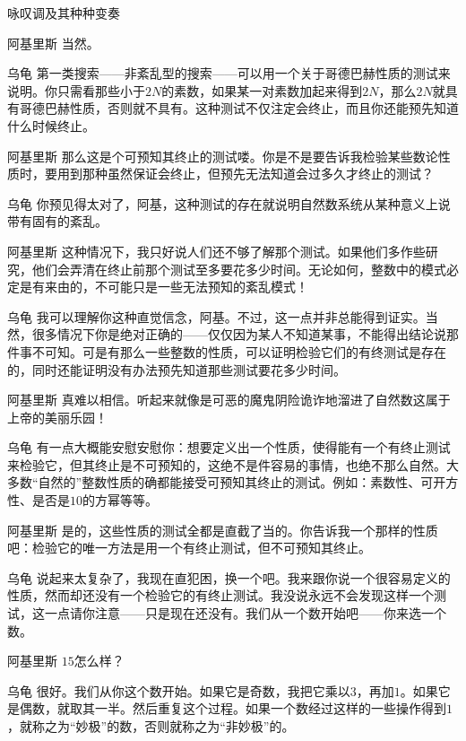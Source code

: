 \begin{dialog}{咏叹调及其种种变奏}
\begin{dialogue}
\item[阿基里斯]当然。

\item[乌龟]第一类搜索——非紊乱型的搜索——可以用一个关于哥德巴赫性质的测试来说明。你只需看那些小于$2N$的素数，如果某一对素数加起来得到$2N$，那么$2N$就具有哥德巴赫性质，否则就不具有。这种测试不仅注定会终止，而且你还能预先知道什么时候终止。

\item[阿基里斯]那么这是个可预知其终止的测试喽。你是不是要告诉我检验某些数论性质时，要用到那种虽然保证会终止，但预先无法知道会过多久才终止的测试？

\item[乌龟]你预见得太对了，阿基，这种测试的存在就说明自然数系统从某种意义上说带有固有的紊乱。

\item[阿基里斯]这种情况下，我只好说人们还不够了解那个测试。如果他们多作些研究，他们会弄清在终止前那个测试至多要花多少时间。无论如何，整数中的模式必定是有来由的，不可能只是一些无法预知的紊乱模式！

\item[乌龟]我可以理解你这种直觉信念，阿基。不过，这一点并非总能得到证实。当然，很多情况下你是绝对正确的——仅仅因为某人不知道某事，不能得出结论说那件事不可知。可是有那么一些整数的性质，可以证明检验它们的有终测试是存在的，同时还能证明没有办法预先知道那些测试要花多少时间。

\item[阿基里斯]真难以相信。听起来就像是可恶的魔鬼阴险诡诈地溜进了自然数这属于上帝的美丽乐园！

\item[乌龟]有一点大概能安慰安慰你：想要定义出一个性质，使得能有一个有终止测试来检验它，但其终止是不可预知的，这绝不是件容易的事情，也绝不那么自然。大多数“自然的”整数性质的确都能接受可预知其终止的测试。例如：素数性、可开方性、是否是$10$的方幂等等。

\item[阿基里斯]是的，这些性质的测试全都是直截了当的。你告诉我一个那样的性质吧：检验它的唯一方法是用一个有终止测试，但不可预知其终止。

\item[乌龟]说起来太复杂了，我现在直犯困，换一个吧。我来跟你说一个很容易定义的性质，然而却还没有一个检验它的有终止测试。我没说永远不会发现这样一个测试，这一点请你注意——只是现在还没有。我们从一个数开始吧——你来选一个数。

\item[阿基里斯]$15$怎么样？

\item[乌龟]很好。我们从你这个数开始。如果它是奇数，我把它乘以$3$，再加$1$。如果它是偶数，就取其一半。然后重复这个过程。如果一个数经过这样的一些操作得到$1$，就称之为“妙极”的数，否则就称之为“非妙极”的。


\end{dialogue}
\end{dialog}
